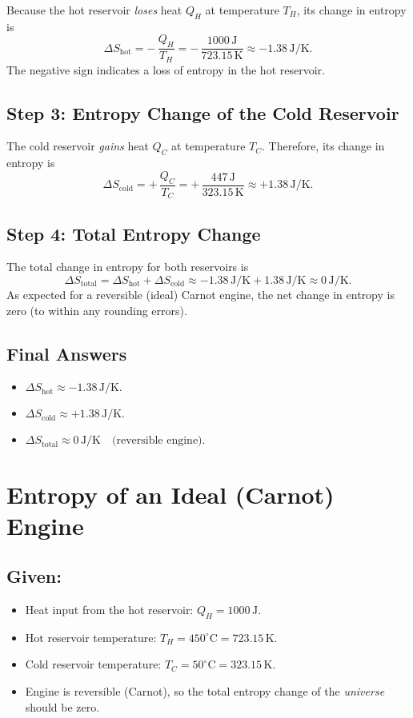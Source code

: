 \documentclass[12pt]{article}
\theoremstyle{definition} %
\theoremstyle{plain} %
\begin{document}
Because the hot reservoir \emph{loses} heat \(Q_H\) at temperature \(T_H\), its change in entropy is
\[
\Delta S_{\text{hot}} = -\,\frac{Q_H}{T_H}
= -\,\frac{1000\,\mathrm{J}}{723.15\,\mathrm{K}}
\approx -1.38\,\mathrm{J/K}.
\]
The negative sign indicates a loss of entropy in the hot reservoir.

\subsection*{Step 3: Entropy Change of the Cold Reservoir}

The cold reservoir \emph{gains} heat \(Q_C\) at temperature \(T_C\). Therefore, its change in entropy is
\[
\Delta S_{\text{cold}} 
= +\,\frac{Q_C}{T_C}
= +\,\frac{447\,\mathrm{J}}{323.15\,\mathrm{K}}
\approx +1.38\,\mathrm{J/K}.
\]

\subsection*{Step 4: Total Entropy Change}

The total change in entropy for both reservoirs is
\[
\Delta S_{\text{total}}
= \Delta S_{\text{hot}} + \Delta S_{\text{cold}}
\approx -1.38\,\mathrm{J/K} + 1.38\,\mathrm{J/K} \approx 0\,\mathrm{J/K}.
\]
As expected for a reversible (ideal) Carnot engine, the net change in entropy is zero (to within any rounding errors).

\subsection*{Final Answers}
\begin{itemize}
    \item \(\displaystyle \Delta S_{\text{hot}} \approx -1.38 \,\mathrm{J/K}.\)
    \item \(\displaystyle \Delta S_{\text{cold}} \approx +1.38 \,\mathrm{J/K}.\)
    \item \(\displaystyle \Delta S_{\text{total}} \approx 0 \,\mathrm{J/K} \quad \text{(reversible engine).}\)
\end{itemize}


\section*{Entropy of an Ideal (Carnot) Engine}

\subsection*{Given:}
\begin{itemize}
    \item Heat input from the hot reservoir: \( Q_H = 1000 \,\mathrm{J} \).
    \item Hot reservoir temperature: \( T_H = 450^\circ \mathrm{C} = 723.15\,\mathrm{K}.\)
    \item Cold reservoir temperature: \( T_C = 50^\circ \mathrm{C}  = 323.15\,\mathrm{K}.\)
    \item Engine is reversible (Carnot), so the total entropy change of the \emph{universe} should be zero.
\end{itemize}
\end{document}
